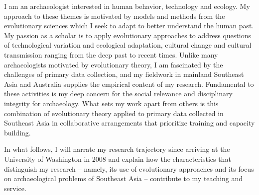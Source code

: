 \documentclass[11pt,article,oneside]{memoir}
\begin{document}


\nonzeroparskip
\setlength{\parindent}{0pt}

\bigskip       


I am an archaeologist interested in human behavior, technology and ecology. My approach to these themes is motivated by models and methods from the evolutionary sciences which I seek to adapt to better understand the human past. My passion as a scholar is to apply evolutionary approaches to address questions of technological variation and ecological adaptation, cultural change and cultural transmission ranging from the deep past to recent times. Unlike many archaeologists motivated by evolutionary theory, I am fascinated by the challenges of primary data collection, and my fieldwork in mainland Southeast Asia and Australia supplies the empirical content of my research. Fundamental to these activities is my deep concern for the social relevance and disciplinary integrity for archaeology. What sets my work apart from others is this combination of evolutionary theory applied to primary data collected in Southeast Asia in collaborative arrangements that prioritize training and capacity building.  

In what follows, I will narrate my research trajectory since arriving at the University of Washington in 2008 and explain how the characteristics that distinguish my research – namely, its use of evolutionary approaches and its focus on archaeological problems of Southeast Asia – contribute to my teaching and service. 

\bigskip  

\end{document}
